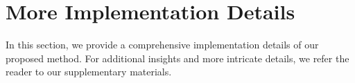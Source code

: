 \newpage
\appendix
\onecolumn







\section{More Implementation Details}\label{app:imple_details}

In this section, we provide a comprehensive implementation details of our proposed method. For additional insights and more intricate details, we refer the reader to our supplementary materials.


